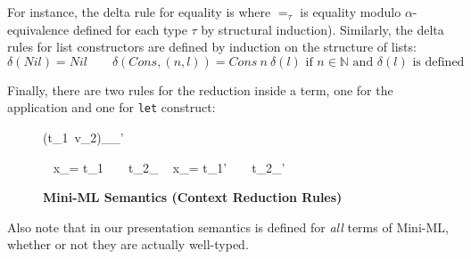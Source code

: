 \documentclass[a4paper,11pt,oneside]{article}
\theoremstyle{plain}
\newcommand{\mem}{_{\mu}}\newcommand{\memp}{_{\mu'}}
\begin{document}
	For instance, the delta rule for equality is 
	where $=_\tau$ is equality modulo $\alpha$-equivalence defined for each type $\tau$ by structural induction).
	Similarly, the delta rules for list constructors are defined by induction on the structure of lists: 
	 $$\delta(Nil) = Nil \qquad \delta(Cons, (n, l)) = Cons~n~\delta(l) 
	 \text{    if } n \in \mathbb{N} \text{ and } \delta(l) \text{ is defined } $$

 Finally, there are two rules for the reduction inside a term, one for the application and one for \texttt{let} construct: 
	\begin{figure}[H]
	\begin{small}
	\begin{spacing}{1.2} 	
	\begin{adjustwidth}{-6em}{-6em}
	\begin{minipage}[t]{0.41\linewidth}
	\infrule[E-App-T]	
	{{t_{1}}\mem \rightarrow {{t'}_{1}}\memp}
	{{(t_{1}~v_2)}\mem {}\memp}
	\end{minipage}
	\begin{minipage}[t]{0.45\linewidth}
	\infrule[E-Let-T]
	{{t_{1}}\mem \rightarrow {{t'}_{1}}\memp}
	{ ~ x_\tau = t_{1} ~ ~ {t_{2}}\mem
		\rightarrow 
		 ~ x_\tau = t_{1}' ~ ~ {t_{2}}\memp}
 \end{minipage}
 \end{adjustwidth}
\end{spacing}
\end{small}
\caption{ \textbf{Mini-ML Semantics (Context Reduction Rules)} \hfill}
\label{mini-ml-def-sem}
\end{figure}

Also note that in our presentation semantics is defined for \textit{all} terms of Mini-ML, whether or not they are actually well-typed. 
\end{document}
